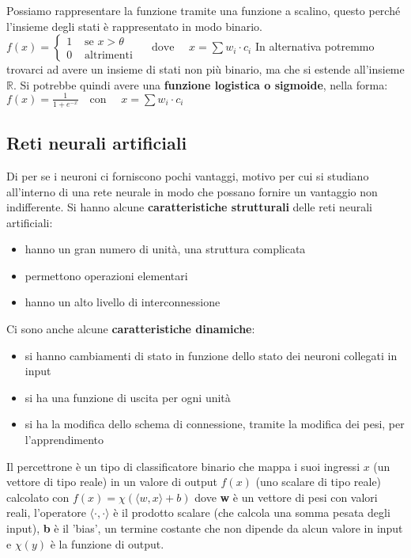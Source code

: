 Possiamo rappresentare la funzione tramite una funzione a scalino, questo perché  l'insieme degli stati è rappresentato in modo binario. 
$f(x)=  \begin{cases}
            1 &\mbox{ se } x > \theta\\
            0 &\mbox{ altrimenti}
        \end{cases} \quad \mbox{   dove } 
    \quad x=\sum w_i\cdot c_i$
In alternativa potremmo trovarci ad avere un insieme di stati non più binario, ma che si estende all'insieme $\mathbb{R}$. Si potrebbe quindi avere una \textbf{funzione logistica o sigmoide}, nella forma: $f(x)=\frac{1}{1+e^{-x}} \quad \mbox{con } \quad x=\sum w_i\cdot c_i$

\subsection{Reti neurali artificiali}
Di per se i neuroni ci forniscono pochi vantaggi, motivo per cui si studiano all'interno di una rete neurale in modo che possano fornire un vantaggio non indifferente. 
Si hanno alcune \textbf{caratteristiche strutturali} delle reti neurali artificiali: 
\begin{itemize} 
    \item hanno un gran numero di unità, una struttura complicata
    \item permettono operazioni elementari 
    \item hanno un alto livello di interconnessione 
\end{itemize} 
Ci sono anche alcune \textbf{caratteristiche dinamiche}: 
\begin{itemize} 
    \item si hanno cambiamenti di stato in funzione dello stato dei neuroni collegati in input 
    \item si ha una funzione di uscita per ogni unità 
    \item si ha la modifica dello schema di connessione, tramite la modifica dei pesi, per l'apprendimento 
\end{itemize}

Il percettrone è un tipo di classificatore binario che mappa i suoi ingressi ${\displaystyle x}$ (un vettore di tipo reale) in un valore di output ${\displaystyle f\left(x\right)}$ (uno scalare di tipo reale) calcolato con ${\displaystyle f\left(x\right)=\chi \left(\langle w,x\rangle +b\right)}$ dove \textbf{w} è un vettore di pesi con valori reali, l'operatore ${\displaystyle \langle \cdot ,\cdot \rangle }$ è il prodotto scalare (che calcola una somma pesata degli input), \textbf{b} è il 'bias', un termine costante che non dipende da alcun valore in input e ${\displaystyle \chi \left(y\right)}$ è la funzione di output. \\

